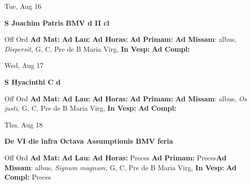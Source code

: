 \documentclass[10pt]{memoir}
\begin{document}
\begin{center}
\begin{minipage}{3.5in}
\vspace{2em}
\begin{center}Tue, Aug 16
\end{center}
\textbf{ \large S Joachim Patris BMV
\textnormal{\normalsize d II cl}}

\begin{justify}Off Ord
\textbf{Ad Mat: }
\textbf{Ad Lau: }
\textbf{Ad Horas: }
\textbf{Ad Primam: }\textbf{Ad Missam}: albus, \textit{Dispersit,} G, C, Pre de B Maria Virg, 
\textbf{In Vesp: }
\textbf{Ad Compl: }
\end{justify}
\end{minipage}
\end{center}

\begin{center}
\begin{minipage}{3.5in}
\vspace{2em}
\begin{center}Wed, Aug 17
\end{center}
\textbf{ \large S Hyacinthi C
\textnormal{\normalsize d}}

\begin{justify}Off Ord
\textbf{Ad Mat: }
\textbf{Ad Lau: }
\textbf{Ad Horas: }
\textbf{Ad Primam: }\textbf{Ad Missam}: albus, \textit{Os justi,} G, C, Pre de B Maria Virg, 
\textbf{In Vesp: }
\textbf{Ad Compl: }
\end{justify}
\end{minipage}
\end{center}

\begin{center}
\begin{minipage}{3.5in}
\vspace{2em}
\begin{center}Thu, Aug 18
\end{center}
\textbf{ \large De VI die infra Octava Assumptionis BMV
\textnormal{\normalsize feria}}

\begin{justify}Off Ord
\textbf{Ad Mat: }
\textbf{Ad Lau: }
\textbf{Ad Horas: }Preces
\textbf{Ad Primam: }Preces\textbf{Ad Missam}: albus, \textit{Signum magnum,} G, C, Pre de B Maria Virg, 
\textbf{In Vesp: }
\textbf{Ad Compl: }Preces
\end{justify}
\end{minipage}
\end{center}
\end{document}
